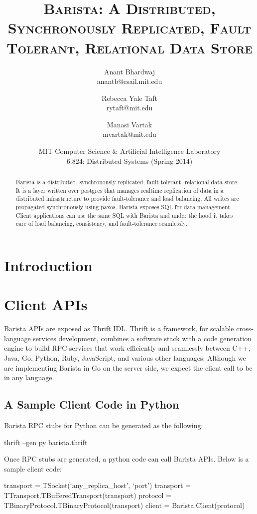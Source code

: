 \documentclass[a4paper]{article}
\title{\textsc{Barista: A Distributed, Synchronously Replicated, Fault Tolerant, Relational Data Store}}
\author{Anant Bhardwaj \\ anantb@csail.mit.edu \and Rebecca Yale Taft \\ rytaft@mit.edu \and Manasi Vartak \\ mvartak@mit.edu}
\date{MIT Computer Science \& Artificial Intelligence Laboratory \\ 6.824: Distributed Systems (Spring 2014)}
\begin{document}
\maketitle
\begin{multicols}{2}
\begin{abstract}
Barista is a distributed, synchronously replicated, fault tolerant, relational data store. It is a layer written over postgres that manages realtime replication of data in a distributed infrastructure to provide fault-tolerance and load balancing. All writes are propagated synchronously using paxos. Barista exposes SQL for data management. Client applications can use the same SQL with Barista and under the hood it takes care of load balancing, consistency, and fault-tolerance seamlessly.
\end{abstract}
\section{Introduction}

\section{Client APIs}
\par{
Barista APIs are exposed as Thrift IDL. Thrift is a framework, for scalable cross-language services development, combines a software stack with a code generation engine to build RPC services that work efficiently and seamlessly between C++, Java, Go, Python, Ruby, JavaScript, and various other languages. Although we are implementing Barista in Go on the server side, we expect the client call to be in any language.
}
\subsection{A Sample Client Code in Python}
\par{
Barista RPC stubs for Python can be generated as the following:
\begin{spverbatim}
thrift --gen py barista.thrift

\end{spverbatim}
}
\par{
Once RPC stubs are generated, a python code can call Barista APIs. Below is a sample client code:
}
\par{
\tiny {
\begin{spverbatim}
transport = TSocket(`any_replica_host', `port')
transport = TTransport.TBufferedTransport(transport)
protocol = TBinaryProtocol.TBinaryProtocol(transport)
client = Barista.Client(protocol)


\end{spverbatim}}}
\end{multicols}
\end{document}
